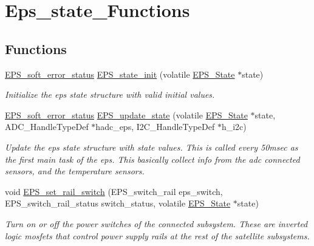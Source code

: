 \hypertarget{group__eps__state___functions}{\section{Eps\-\_\-state\-\_\-\-Functions}
\label{group__eps__state___functions}
}
\subsection*{Functions}
\begin{DoxyCompactItemize}
\item 
\hyperlink{group__softerror_ga82875cd4cc1b94ab7e638961c1b79e08}{E\-P\-S\-\_\-soft\-\_\-error\-\_\-status} \hyperlink{group__eps__state___functions_ga45b2db28354ce2fc717def9e9df0fc80}{E\-P\-S\-\_\-state\-\_\-init} (volatile \hyperlink{struct_e_p_s___state}{E\-P\-S\-\_\-\-State} $\ast$state)
\begin{DoxyCompactList}\small\item\em Initialize the eps state structure with valid initial values. \end{DoxyCompactList}\item 
\hyperlink{group__softerror_ga82875cd4cc1b94ab7e638961c1b79e08}{E\-P\-S\-\_\-soft\-\_\-error\-\_\-status} \hyperlink{group__eps__state___functions_ga7b4d6210572c20f5c47da460496d7cd0}{E\-P\-S\-\_\-update\-\_\-state} (volatile \hyperlink{struct_e_p_s___state}{E\-P\-S\-\_\-\-State} $\ast$state, A\-D\-C\-\_\-\-Handle\-Type\-Def $\ast$hadc\-\_\-eps, I2\-C\-\_\-\-Handle\-Type\-Def $\ast$h\-\_\-i2c)
\begin{DoxyCompactList}\small\item\em Update the eps state structure with state values. This is called every 50msec as the first main task of the eps. This basically collect info from the adc connected sensors, and the temperature sensors. \end{DoxyCompactList}\item 
void \hyperlink{group__eps__state___functions_ga0a10187a305282e2f01cd6acf58b5dff}{E\-P\-S\-\_\-set\-\_\-rail\-\_\-switch} (E\-P\-S\-\_\-switch\-\_\-rail eps\-\_\-switch, E\-P\-S\-\_\-switch\-\_\-rail\-\_\-status switch\-\_\-status, volatile \hyperlink{struct_e_p_s___state}{E\-P\-S\-\_\-\-State} $\ast$state)
\begin{DoxyCompactList}\small\item\em Turn on or off the power switches of the connected subsystem. These are inverted logic mosfets that control power supply rails at the rest of the satellite subsystems. \end{DoxyCompactList}\item 

\end{DoxyCompactItemize}
